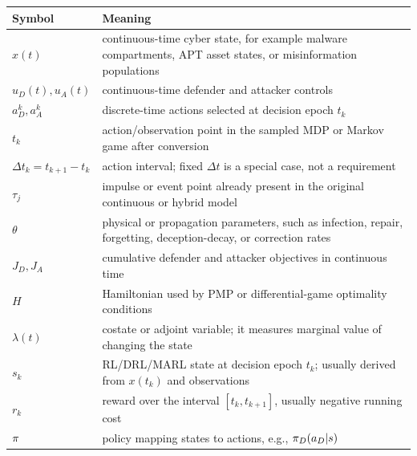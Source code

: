 \documentclass[11pt,a4paper]{article}
\begin{document}
\begin{longtable}{p{}p{}}
\toprule
Symbol & Meaning \\
\midrule
$x(t)$ & continuous-time cyber state, for example malware compartments, APT asset states, or misinformation populations \\
$u_D(t),u_A(t)$ & continuous-time defender and attacker controls \\
$a_D^k,a_A^k$ & discrete-time actions selected at decision epoch $t_k$ \\
$t_k$ & action/observation point in the sampled MDP or Markov game after conversion \\
$\Delta t_k=t_{k+1}-t_k$ & action interval; fixed $\Delta t$ is a special case, not a requirement \\
$\tau_j$ & impulse or event point already present in the original continuous or hybrid model \\
$\theta$ & physical or propagation parameters, such as infection, repair, forgetting, deception-decay, or correction rates \\
$J_D,J_A$ & cumulative defender and attacker objectives in continuous time \\
$H$ & Hamiltonian used by PMP or differential-game optimality conditions \\
$\lambda(t)$ & costate or adjoint variable; it measures marginal value of changing the state \\
$s_k$ & RL/DRL/MARL state at decision epoch $t_k$; usually derived from $x(t_k)$ and observations \\
$r_k$ & reward over the interval $[t_k,t_{k+1}]$, usually negative running cost \\
$\pi$ & policy mapping states to actions, e.g., $\pi_D(a_D|s)$ \\
\bottomrule
\end{longtable}
\end{document}

